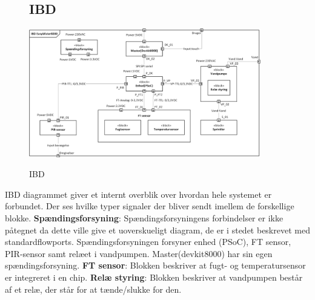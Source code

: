 \begin{figure}[H] \centering
\subsection{IBD}
{\includegraphics[width=0.9\textwidth]{filer/systemarkitektur/IBD}}
\caption{IBD}
\label{lab:ibd}
\raggedright
\end{figure}
IBD diagrammet giver et internt overblik over hvordan hele systemet er forbundet. Der ses hvilke typer signaler der bliver sendt imellem de forskellige blokke. \newline \newline
\textbf{Spændingsforsyning}: Spændingsforsyningens forbindelser er ikke påtegnet da dette ville give et uoverskueligt diagram, de er i stedet beskrevet med standardflowports. Spændingsforsyningen forsyner enhed (PSoC), FT sensor, PIR-sensor samt relæet i vandpumpen. Master(devkit8000) har sin egen spændingsforsyning.  \newline \newline
\textbf{FT sensor}: Blokken beskriver at fugt- og temperatursensor er integreret i en chip. \newline \newline
\textbf{Relæ styring}: Blokken beskriver at vandpumpen består af et relæ, der står for at tænde/slukke for den. \newline \newline

